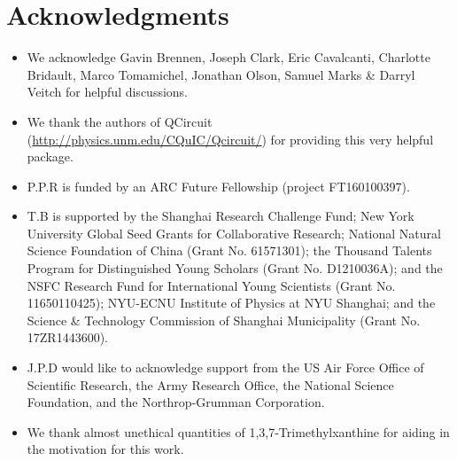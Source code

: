 %
%

\section*{Acknowledgments}

\begin{itemize}
\item We acknowledge Gavin Brennen, Joseph Clark, Eric Cavalcanti, Charlotte Bridault, Marco Tomamichel, Jonathan Olson, Samuel Marks \& Darryl Veitch  for helpful discussions.
\item We thank the authors of QCircuit (\href{http://physics.unm.edu/CQuIC/Qcircuit/}{http://physics.unm.edu/CQuIC/Qcircuit/}) for providing this very helpful package.
\item P.P.R is funded by an ARC Future Fellowship (project FT160100397).
\item T.B is supported by the Shanghai Research Challenge Fund; New York University Global Seed Grants for Collaborative Research; National Natural Science Foundation of China (Grant No. 61571301); the Thousand Talents Program for Distinguished Young Scholars (Grant No. D1210036A); and the NSFC Research Fund for International Young Scientists (Grant No. 11650110425); NYU-ECNU Institute of Physics at NYU Shanghai; and the Science \& Technology Commission of Shanghai Municipality (Grant No. 17ZR1443600).
\item J.P.D would like to acknowledge support from the US Air Force Office of Scientific Research, the Army Research Office, the National Science Foundation, and the Northrop-Grumman Corporation.
\item We thank almost unethical quantities of 1,3,7-Trimethylxanthine for aiding in the motivation for this work.
\end{itemize}